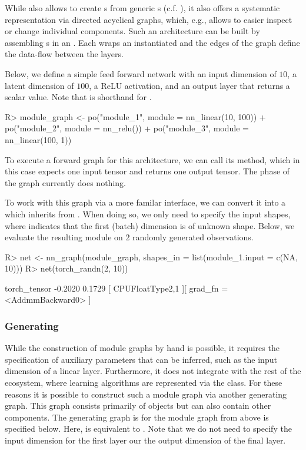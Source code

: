 \documentclass[article]{jss}
\theoremstyle{definition}
\begin{document}
While  also allows to create s from generic s (c.f. ), it also offers a systematic representation via directed acyclical graphs, which, e.g., allows to easier inspect or change individual components.
Such an architecture can be built by assembling s in an .
Each  wraps an instantiated  and the edges of the graph define the data-flow between the layers.

Below, we define a simple feed forward network with an input dimension of $10$, a latent dimension of $100$, a ReLU activation, and an output layer that returns a scalar value.
Note that  is shorthand for .

\begin{CodeInput}
R> module_graph <- po("module_1", module = nn_linear(10, 100)) %
+   po("module_2", module = nn_relu()) %
+   po("module_3", module = nn_linear(100, 1))
\end{CodeInput}

To execute a forward graph for this architecture, we can call its  method, which in this case expects one input tensor and returns one output tensor.
The  phase of the graph currently does nothing.

To work with this graph via a more familar interface, we can convert it into a  which inherits from .
When doing so, we only need to specify the input shapes, where  indicates that the first (batch) dimension is of unknown shape.
Below, we evaluate the resulting module on 2 randomly generated observations.

\begin{CodeInput}
R> net <- nn_graph(module_graph, shapes_in = list(module_1.input = c(NA, 10)))
R> net(torch_randn(2, 10))
\end{CodeInput}
\begin{CodeOutput}
torch_tensor
-0.2020
 0.1729
[ CPUFloatType{2,1} ][ grad_fn = <AddmmBackward0> ]
\end{CodeOutput}

\subsubsection[Generating Graph]{Generating }

While the construction of module graphs by hand is possible, it requires the specification of auxiliary parameters that can be inferred, such as the input dimension of a linear layer.
Furthermore, it does not integrate with the rest of the  ecosystem, where learning algorithms are represented via the  class.
For these reasons it is possible to construct such a module graph via another generating graph.
This graph consists primarily of  objects but can also contain other components.
The generating graph is for the module graph from above is specified below.
Here,  is equivalent to .
Note that we do not need to specify the input dimension for the first layer our the output dimension of the final layer.
\end{document}
